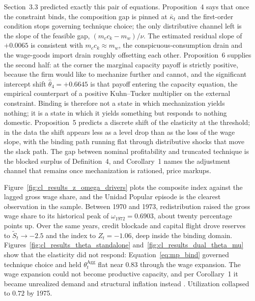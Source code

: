 Section~3.3 predicted exactly this pair of equations. Proposition~4 says
that once the constraint binds, the composition gap is pinned at
$\bar{\kappa}_t$ and the first-order condition stops governing technique
choice; the only distributive channel left is the slope of the feasible gap,
$(m_c c_k - m_w)/\nu$. The estimated residual slope of $+0.0065$ is
consistent with $m_c c_k \approx m_w$, the conspicuous-consumption drain and
the wage-goods import drain roughly offsetting each other. Proposition~6
supplies the second half: at the corner the marginal capacity payoff is
strictly positive, because the firm would like to mechanize further and
cannot, and the significant intercept shift $\hat{\theta}_4 = +0.6645$ is
that payoff entering the capacity equation, the empirical counterpart of a
positive Kuhn--Tucker multiplier on the external constraint. Binding is
therefore not a state in which mechanization yields nothing; it is a state
in which it yields something but responds to nothing domestic.
Proposition~5 predicts a discrete shift of the elasticity at the threshold;
in the data the shift appears less as a level drop than as the loss of the
wage slope, with the binding path running flat through distributive shocks
that move the slack path. The gap between nominal profitability and
truncated technique is the blocked surplus of Definition~4, and Corollary~1
names the adjustment channel that remains once mechanization is rationed,
price markups.

Figure~\ref{fig:cl_results_z_omega_drivers} plots the composite index
against the lagged gross wage share, and the Unidad Popular episode is the
clearest observation in the sample. Between 1970 and 1973, redistribution
raised the gross wage share to its historical peak of
$\omega_{1972} = 0.6903$, about twenty percentage points up. Over the same
years, credit blockade and capital flight drove reserves to
$\tilde{S}_t \to -2.5$ and the index to $Z_t = -1.06$, deep inside the
binding domain. Figures~\ref{fig:cl_results_theta_standalone}
and~\ref{fig:cl_results_dual_theta_mu} show that the elasticity did not
respond: Equation~\eqref{eq:mp_bind} governed technique choice and held
$\theta_t^{\text{Agg}}$ flat near $0.83$ through the wage expansion. The
wage expansion could not become productive capacity, and per Corollary~1 it
became unrealized demand and structural inflation instead
\citep{Kalecki1955, Sunkel1958}. Utilization collapsed to $0.72$ by 1975.

